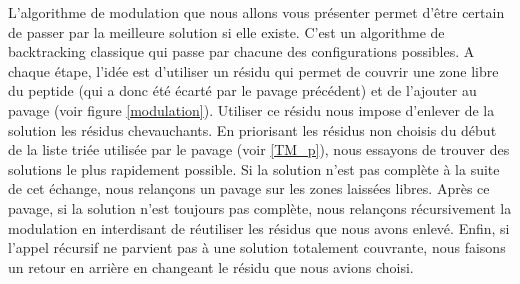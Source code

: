 L'algorithme de modulation que nous allons vous présenter permet d'être certain de passer par la meilleure solution si elle existe.
C'est un algorithme de backtracking classique qui passe par chacune des configurations possibles.
A chaque étape, l'idée est d'utiliser un résidu qui permet de couvrir une zone libre du peptide (qui a donc été écarté par le pavage précédent) et de l'ajouter au pavage (voir figure \ref{modulation}).
Utiliser ce résidu nous impose d'enlever de la solution les résidus chevauchants.
En priorisant les résidus non choisis du début de la liste triée utilisée par le pavage (voir \ref{TM_p}), nous essayons de trouver des solutions le plus rapidement possible.
Si la solution n'est pas complète à la suite de cet échange, nous relançons un pavage sur les zones laissées libres.
Après ce pavage, si la solution n'est toujours pas complète, nous relançons récursivement la modulation en interdisant de réutiliser les résidus que nous avons enlevé.
Enfin, si l'appel récursif ne parvient pas à une solution totalement couvrante, nous faisons un retour en arrière en changeant le résidu que nous avions choisi.

% 
%   
%   
%   
%   
%   
%   


